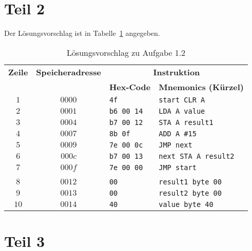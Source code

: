 \section{Teil 2}

Der Lösungsvorschlag ist in Tabelle~\ref{tab:speicherinstruktionen} angegeben.

\begin{table}[h!]
    \setlength{\tabcolsep}{0.5em}
    \def\arraystretch{1.5}
    \centering
    \begin{tabular}{|c|c|l|l|}
        \hline
        \textbf{Zeile} & \textbf{Speicheradresse} & \multicolumn{2}{c|}{\textbf{Instruktion}} \\
        \cline{3-4}
        &                          & \textbf{Hex-Code} & \textbf{Mnemonics (Kürzel)} \\
        \hline
        $1$ & $0000$ & \texttt{4f} & \texttt{start CLR A}  \\

        $2$ & $0001$ & \texttt{b6 00 14} & \qquad\quad\texttt{LDA A value}  \\

        $3$ & $0004$ & \texttt{b7 00 12} & \qquad\quad\texttt{STA A result1}  \\

        $4$ & $0007$ & \texttt{8b 0f} & \qquad\quad\texttt{ADD A \#15}  \\

        $5$ & $0009$ & \texttt{7e 00 0c} & \qquad\quad\texttt{JMP next}  \\

        $6$ & $000c$ & \texttt{b7 00 13} & \texttt{next STA A result2}  \\

        $7$ & $000f$ & \texttt{7e 00 00} & \qquad\quad\texttt{JMP start}\\
        &&&\\
        $8$ & $0012$ & \texttt{00} & \texttt{result1 byte 00}  \\
        $9$ & $0013$ & \texttt{00} & \texttt{result2 byte 00}  \\
        $10$ & $0014$ & \texttt{40} & \texttt{value byte 40}  \\

        \hline
    \end{tabular}
    \caption{Lösungsvorschlag zu Aufgabe 1.2}
    \label{tab:speicherinstruktionen}
\end{table}

\section{Teil 3}

